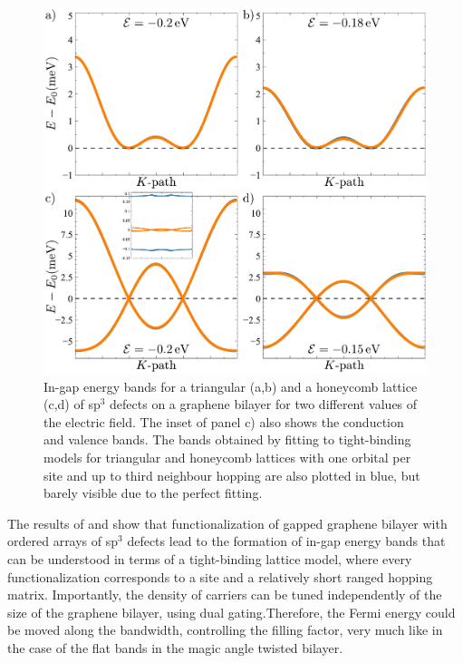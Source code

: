 \begin{figure}[h!]
\centering
\includegraphics{designer/figures/fig_bands.pdf}
\vspace{-15pt}
\caption{In-gap energy bands for a triangular (a,b) and a honeycomb lattice (c,d) of sp$^3$ defects on a graphene bilayer for two different values of the electric field. The inset of panel c) also shows the conduction and valence bands. The bands obtained by fitting to tight-binding models for triangular and honeycomb lattices with one orbital per site and up to third neighbour hopping are also plotted in blue, but barely visible due to the perfect fitting.}
\label{figure2}
\end{figure}


The results of  and  show that functionalization of gapped graphene bilayer with ordered arrays of sp$^3$ defects lead to the formation of in-gap energy bands that can be understood in terms of a tight-binding lattice model, where every functionalization corresponds to a site and a relatively short ranged hopping matrix. 
Importantly, the density of carriers can be tuned independently of the size of the graphene bilayer, using dual gating\cite{Zhang2009,Taychatanapat2010}.Therefore, the Fermi energy could be moved along the bandwidth, controlling the filling factor, very much like in the case of the flat bands in the magic angle twisted bilayer\cite{Cao2018a,Cao2018b}. 

